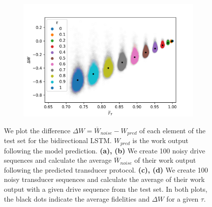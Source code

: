 \begin{figure}[h]
\begin{subfigure}{0.4\textwidth}
	\end{subfigure}
	\begin{subfigure}{0.4\textwidth}
		\centering
		\includegraphics[width=\textwidth]{img/noisy_trans_dt_1}
	\end{subfigure}
	\caption{We plot the difference $\Delta W = \overline{W}_{noise} - W_{pred}$ of each element of the test set for the bidirectional LSTM. $W_{pred}$ is the work output following the model prediction. \textbf{(a), (b)} We create 100 noisy drive sequences and calculate the average $\overline{W}_{noise}$ of their work output following the predicted transducer protocol. \textbf{(c), (d)} We create 100 noisy transducer sequences and calculate the average of their work output with a given drive sequence from the test set. In both plots, the black dots indicate the average fidelities and $\Delta W$ for a given $\tau$.}
	\label{noisedt5}
\end{figure}